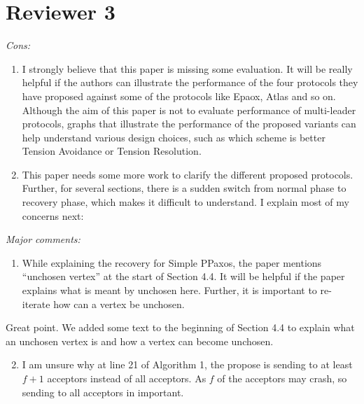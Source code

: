 \documentclass[letterpaper,twocolumn,10pt]{article}
\newenvironment{reviewerquote}
{\list{}{\leftmargin=\parindent\rightmargin=0in}\item[] \itshape \color{ReviewerDarkGray}}%
{\endlist}
\begin{document}
\section*{Reviewer 3}
\begin{reviewerquote}
  Cons:

  \begin{enumerate}
    \setcounter{enumi}{0}
    \item
      I strongly believe that this paper is missing some evaluation. It will be
      really helpful if the authors can illustrate the performance of the four
      protocols they have proposed against some of the protocols like Epaox,
      Atlas and so on. Although the aim of this paper is not to evaluate
      performance of multi-leader protocols, graphs that illustrate the
      performance of the proposed variants can help understand various design
      choices, such as which scheme is better Tension Avoidance or Tension
      Resolution.
    \item
      This paper needs some more work to clarify the different proposed
      protocols. Further, for several sections, there is a sudden switch from
      normal phase to recovery phase, which makes it difficult to understand. I
      explain most of my concerns next:
  \end{enumerate}
\end{reviewerquote}

\begin{reviewerquote}
  Major comments:

  \begin{enumerate}
    \setcounter{enumi}{0}
    \item
      While explaining the recovery for Simple PPaxos, the paper mentions
      ``unchosen vertex'' at the start of Section 4.4. It will be helpful if
      the paper explains what is meant by unchosen here. Further, it is
      important to re-iterate how can a vertex be unchosen.
  \end{enumerate}
\end{reviewerquote}

Great point. We added some text to the beginning of Section 4.4 to explain what
an unchosen vertex is and how a vertex can become unchosen.

\begin{reviewerquote}
  \begin{enumerate}
    \setcounter{enumi}{1}
    \item
      I am unsure why at line 21 of Algorithm 1, the propose is sending to at
      least $f+1$ acceptors instead of all acceptors. As $f$ of the acceptors
      may crash, so sending to all acceptors in important.
  \end{enumerate}
\end{reviewerquote}
\end{document}
